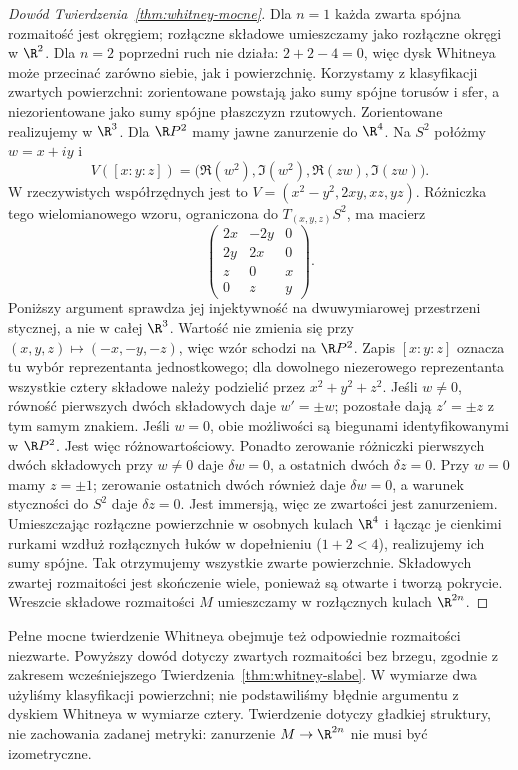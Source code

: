 \begin{proof}[Dowód Twierdzenia~\ref{thm:whitney-mocne}]
Dla $n=1$ każda zwarta spójna
rozmaitość jest okręgiem;
rozłączne składowe umieszczamy
jako rozłączne okręgi w $\R^2$.
Dla $n=2$ poprzedni ruch nie
działa: $2+2-4=0$, więc dysk
Whitneya może przecinać
zarówno siebie, jak i powierzchnię.
Korzystamy z klasyfikacji
zwartych powierzchni:
zorientowane powstają jako
sumy spójne torusów i sfer,
a niezorientowane jako sumy
spójne płaszczyzn rzutowych.
Zorientowane realizujemy w $\R^3$.
Dla $\R P^2$ mamy jawne zanurzenie
do $\R^4$. Na $S^2$ połóżmy
$w=x+iy$ i
\[
 V([x:y:z])
   =\bigl(\Re(w^2),
           \Im(w^2),
           \Re(zw),
           \Im(zw)\bigr).
\]
W rzeczywistych współrzędnych jest to
$V=(x^2-y^2,2xy,xz,yz)$.
Różniczka tego wielomianowego wzoru, ograniczona
do $T_{(x,y,z)}S^2$, ma macierz
\[
 \begin{pmatrix}
  2x&-2y&0\\ 2y&2x&0\\ z&0&x\\0&z&y
 \end{pmatrix}.
\]
Poniższy argument sprawdza jej injektywność
na dwuwymiarowej przestrzeni stycznej, a nie w całej $\R^3$.
Wartość nie zmienia się przy
$(x,y,z)\mapsto(-x,-y,-z)$,
więc wzór schodzi na $\R P^2$. Zapis $[x:y:z]$
oznacza tu wybór reprezentanta jednostkowego;
dla dowolnego niezerowego reprezentanta wszystkie
cztery składowe należy podzielić przez $x^2+y^2+z^2$.
Jeśli $w\ne0$, równość pierwszych
dwóch składowych daje $w'=\pm w$;
pozostałe dają $z'=\pm z$
z tym samym znakiem. Jeśli $w=0$,
obie możliwości są biegunami
identyfikowanymi w $\R P^2$.
Jest więc różnowartościowy.
Ponadto zerowanie różniczki
pierwszych dwóch składowych
przy $w\ne0$ daje $\delta w=0$,
a ostatnich dwóch $\delta z=0$.
Przy $w=0$ mamy $z=\pm1$;
zerowanie ostatnich dwóch
również daje $\delta w=0$,
a warunek styczności do $S^2$
daje $\delta z=0$. Jest immersją,
więc ze zwartości jest zanurzeniem.
Umieszczając rozłączne powierzchnie
w osobnych kulach $\R^4$ i łącząc
je cienkimi rurkami wzdłuż
rozłącznych łuków w dopełnieniu
($1+2<4$), realizujemy ich
sumy spójne. Tak otrzymujemy
wszystkie zwarte powierzchnie.
Składowych zwartej rozmaitości jest skończenie
wiele, ponieważ są otwarte i tworzą pokrycie.
Wreszcie składowe rozmaitości $M$ umieszczamy w rozłącznych
kulach $\R^{2n}$.
\end{proof}

\begin{uwaga}
Pełne mocne twierdzenie Whitneya
obejmuje też odpowiednie rozmaitości
niezwarte. Powyższy dowód dotyczy
zwartych rozmaitości bez brzegu,
zgodnie z zakresem wcześniejszego
Twierdzenia~\ref{thm:whitney-slabe}.
W wymiarze dwa użyliśmy
klasyfikacji powierzchni; nie
podstawiliśmy błędnie argumentu
z dyskiem Whitneya w wymiarze cztery.
Twierdzenie dotyczy gładkiej struktury,
nie zachowania zadanej metryki:
zanurzenie $M\to\R^{2n}$ nie musi
być izometryczne.
\end{uwaga}

